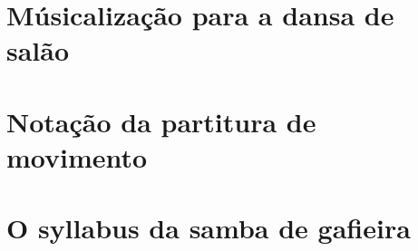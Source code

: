 \documentclass[11pt,fleqn]{book} %
\begin{document}
\part{Músicalização para a dansa de salão}





\part{Notação da partitura de movimento}




\part{O syllabus da samba de gafieira}






\end{document}
